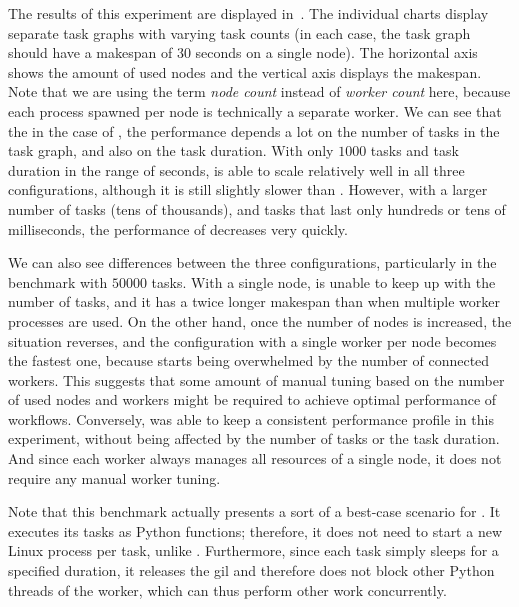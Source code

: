 The results of this experiment are displayed in~. The individual charts
display separate task graphs with varying task counts (in each case, the task graph should have a
makespan of $30$ seconds on a single node). The horizontal axis shows the amount
of used nodes and the vertical axis displays the makespan. Note that we are using the term
\emph{node count} instead of \emph{worker count} here, because each
\dask{} process spawned per node is technically a separate worker. We can see that
the in the case of \dask{}, the performance depends a lot on the number of tasks in
the task graph, and also on the task duration. With only $1000$ tasks and task
duration in the range of seconds, \dask{} is able to scale relatively well in all
three configurations, although it is still slightly slower than \hyperqueue{}. However,
with a larger number of tasks (tens of thousands), and tasks that last only hundreds or tens of
milliseconds, the performance of \dask{} decreases very quickly.

We can also see differences between the three \dask{} configurations, particularly
in the benchmark with $50000$ tasks. With a single node, \dask{} is
unable to keep up with the number of tasks, and it has a twice longer makespan than when multiple
worker processes are used. On the other hand, once the number of nodes is increased, the situation
reverses, and the configuration with a single worker per node becomes the fastest one, because
\dask{} starts being overwhelmed by the number of connected workers. This suggests
that some amount of manual tuning based on the number of used nodes and workers might be required
to achieve optimal performance of \dask{} workflows. Conversely,
\hyperqueue{} was able to keep a consistent performance profile in this experiment,
without being affected by the number of tasks or the task duration. And since each
\hq{} worker always manages all resources of a single node, it does not require
any manual worker tuning.

Note that this benchmark actually presents a sort of a best-case scenario for
\dask{}. It executes its tasks as Python functions; therefore, it does not need to
start a new Linux process per task, unlike \hyperqueue{}. Furthermore, since each task
simply sleeps for a specified duration, it releases the \gls{gil} and therefore does
not block other Python threads of the worker, which can thus perform other work concurrently.

